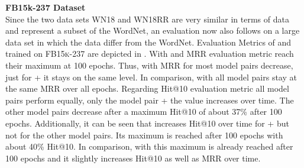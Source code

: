 \textbf{FB15k-237 Dataset}
\label{subsubsec:methods_fb15k237}\\
%
Since the two data sets WN18 and WN18RR are very similar in terms of data and represent a subset of the WordNet, an evaluation now also follows on a large data set in which the data differ from the WordNet.
Evaluation Metrics of \usmax and \ussoftmax trained on \textsc{FB15k-237} are depicted in .
With \usmax and \ussoftmax MRR evaluation metric reach their maximum at 100 epochs. 
Thus, with \usmax MRR for most model pairs decrease, just for \complex + \transe it stays on the same level.
In comparison, with \ussoftmax all model pairs stay at the same MRR over all epochs.
Regarding Hit@10 evaluation metric all model pairs perform equally, only the model pair \complex + \transe the value increases over time.
The other model pairs decrease after a maximum Hit@10 of about 37\% after 100 epochs.
Additionally, it can be seen that \usmax increases Hit@10 over time for \complex + \transe but not for the other model pairs.
Its maximum is reached after 100 epochs with about 40\% Hit@10.
In comparison, with \ussoftmax this maximum is already reached after 100 epochs and it slightly increases Hit@10 as well as MRR over time.
\clearpage
